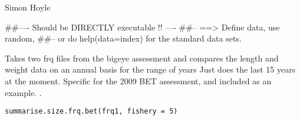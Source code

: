 \documentclass[a4paper]{book}
\begin{document}
%
\begin{Arguments}
\begin{ldescription}
\item[\code{doitall}] 


\item[\code{new.steepness}] 


\item[\code{add\_header}] 


\item[\code{gap}] 


\end{ldescription}
\end{Arguments}
%
\begin{Author}\relax

Simon Hoyle
\end{Author}
%
\begin{Examples}
\begin{ExampleCode}
##---- Should be DIRECTLY executable !! ----
##-- ==>  Define data, use random,
##--	or do  help(data=index)  for the standard data sets.

\end{ExampleCode}
\end{Examples}
%
\begin{Description}\relax

Takes two frq files from the bigeye assessment and compares the length and weight data on an annual basis for the range of years
Just does the last 15 years at the moment. Specific for the 2009 BET assessment, and included as an example. . 
\end{Description}
%
\begin{Usage}
\begin{verbatim}
summarise.size.frq.bet(frq1, fishery = 5)
\end{verbatim}
\end{Usage}
%
\begin{Arguments}
\begin{ldescription}
\item[\code{frq1}] 


\item[\code{fishery}] 


\end{ldescription}
\end{Arguments}
\end{document}
